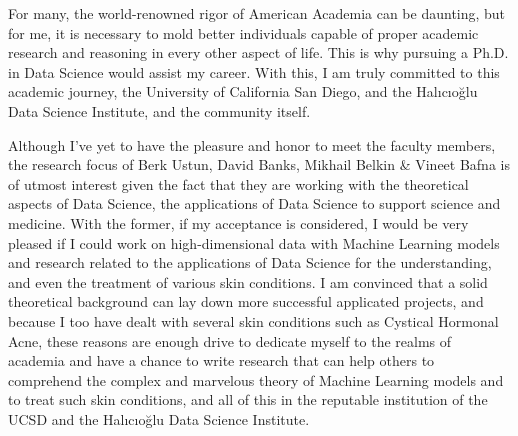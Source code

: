 	For many, the world-renowned rigor of American Academia can be daunting, but for me, it is necessary to mold better individuals capable 
	of proper academic research and reasoning in every other aspect of life. This is why pursuing a Ph.D. in Data Science would assist
	my career. With this, I am truly committed to this academic journey, the University of California San Diego, and the Halıcıoğlu
	Data Science Institute, and the community itself. 
	
	Although I've yet to have the pleasure and honor to meet the faculty members, the research focus of Berk Ustun, David Banks, 
	Mikhail Belkin & Vineet Bafna is of utmost interest given the fact that they are working with the theoretical aspects
	of Data Science, the applications of Data Science to support science and medicine. With the former, if my acceptance is
	considered, I would be very pleased if I could work on high-dimensional data with Machine Learning models and research
	related to the applications of Data Science for the understanding, and even the treatment of various skin 
	conditions. I am convinced that a solid theoretical background can lay down more successful applicated projects, 
	and because I too have dealt with several skin conditions such as Cystical Hormonal Acne, these reasons
	are enough drive to dedicate myself to the realms of academia and have a chance to write research
	that can help others to comprehend the complex and marvelous theory of Machine Learning models and
	to treat such skin conditions, and all of this in the reputable institution of the UCSD and the Halıcıoğlu Data Science Institute.
